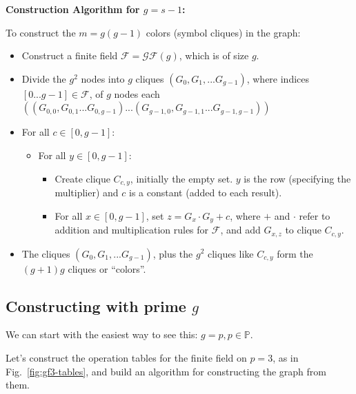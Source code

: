 \documentclass[11pt, oneside]{article} 	%
\begin{document}
\begin{framed}
\textbf{Construction Algorithm for $g=s-1$:}

To construct the $m = g(g-1)$ colors (symbol cliques) in the graph:
\begin{itemize}
 \item Construct a finite field $\mathcal{F} = \mathcal{GF}(g) $, which is of size $g$.
 \item Divide the $g^2$ nodes into $g$ cliques $(G_0, G_1, ... G_{g-1})$, where indices $[0...g-1] \in \mathcal{F}$, of $g$ nodes each $((G_{0,0}, G_{0,1}...G_{0,g-1}) ...(G_{g-1,0}, G_{g-1,1}...G_{g-1,g-1}))$
 \item For all $c \in [0,g-1]$: 
 \begin{itemize}
 \item For all $y \in [0,g-1]$: 
 \begin{itemize}
 \item Create clique $C_{c,y}$, initially the empty set. $y$ is the row (specifying the multiplier) and $c$ is a constant (added to each result).
 \item For all $x \in [0,g-1]$, set $z = G_x \cdot G_y + c$, where $+$ and $\cdot$ refer to addition and multiplication rules for $\mathcal{F}$, and add $G_{x, z}$ to clique $C_{c, y}$.
 \end{itemize}
 \end{itemize}
 \item The cliques $(G_0, G_1, ... G_{g-1})$, plus the $g^2$ cliques like $C_{c, y}$ form the $(g+1)g$ cliques or ``colors''.
\end{itemize}
\end{framed}


\subsection{Constructing with prime $g$}

We can start with the easiest way to see this: $g = p, p \in \mathbb{P}$.

Let's construct the operation tables for the finite field on $p=3$, as in Fig.~\ref{fig:gf3-tables}, and build an algorithm for constructing the graph from them.
\end{document}
